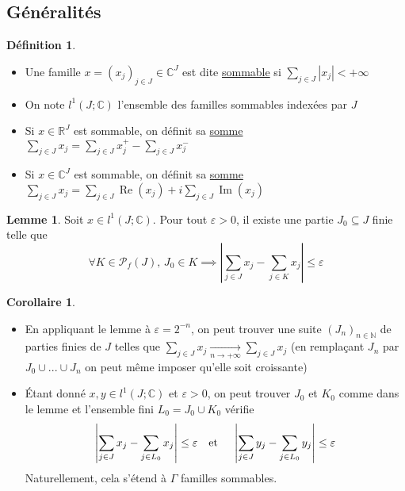 \documentclass[10pt,a4paper]{article}
\theoremstyle{definition}
\newtheorem{corollaire}[proposition]{Corollaire}
\newtheorem{lemme}[proposition]{Lemme}
\newtheorem{definition}[proposition]{Définition}
\DeclareMathOperator{\re}{Re}
\DeclareMathOperator{\im}{Im}
\begin{document}
\subsection{Généralités}
\begin{definition}
\hfill
\begin{itemize}
\item Une famille $x = (x_j)_{j \in J} \in \mathbb{C}^J$ est dite \uline{sommable} si $\sum\limits_{j \in J} |x_j| < +\infty$
\item On note $l^1(J; \mathbb{C})$ l'ensemble des familles sommables indexées par $J$
\item Si $x \in \mathbb{R}^J$ est sommable, on définit sa \uline{somme} $\sum\limits_{j \in J} x_j = \sum\limits_{j \in J} x_j^+ - \sum\limits_{j \in J} x_j^-$
\item Si $x \in \mathbb{C}^J$ est sommable, on définit sa \uline{somme} $\sum\limits_{j \in J} x_j = \sum\limits_{j \in J} \re(x_j) + i \sum\limits_{j \in J} \im(x_j)$
\end{itemize}
\end{definition}
\begin{lemme}
Soit $x \in l^1(J; \mathbb{C})$. Pour tout $\varepsilon > 0$, il existe une partie $J_0 \subseteq J$ finie telle que
\[\forall K \in \mathcal{P}_f(J), \, J_0 \in K \implies \left| \sum\limits_{j \in J} x_j - \sum\limits_{j \in K} x_j \right| \leq \varepsilon\]
\end{lemme}
\begin{corollaire}
\hfill
\begin{itemize}
\item En appliquant le lemme à $\varepsilon = 2^{-n}$, on peut trouver une suite $(J_n)_{n \in \mathbb{N}}$ de parties finies de $J$ telles que $\sum\limits_{j \in J} x_j \xrightarrow[n \to +\infty]{} \sum\limits_{j \in J} x_j$ (en remplaçant $J_n$ par $J_0 \cup ... \cup J_n$ on peut même imposer qu'elle soit croissante)
\item Étant donné $x, y \in l^1(J; \mathbb{C})$ et $\varepsilon > 0$, on peut trouver $J_0$ et $K_0$ comme dans le lemme et l'ensemble fini $L_0 = J_0 \cup K_0$ vérifie
\[\left| \sum\limits_{j \in J} x_j - \sum\limits_{j \in L_0} x_j \right| \leq \varepsilon \text{\quad et \quad}
\left| \sum\limits_{j \in J} y_j - \sum\limits_{j \in L_0} y_j \right| \leq \varepsilon\]
Naturellement, cela s'étend à $\Gamma$ familles sommables.
\end{itemize}
\end{corollaire}
\end{document}
